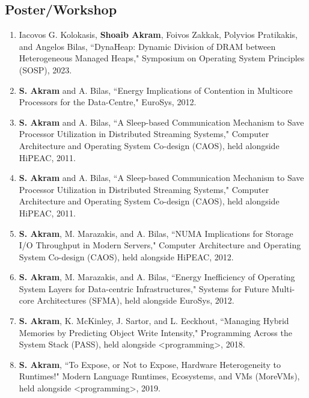 \documentclass[singlecolumn,singlespace,11pt]{article}
\begin{document}
\subsection*{Poster/Workshop}
\begin{enumerate}

\item
Iacovos G. Kolokasis, \textbf{Shoaib Akram}, Foivos Zakkak, Polyvios Pratikakis, and Angelos Bilas, ``DynaHeap: Dynamic Division of DRAM between Heterogeneous Managed Heaps,"
Symposium on Operating System Principles (SOSP), 2023. 

\item
\textbf{S. Akram} and A. Bilas, ``Energy Implications of Contention in Multicore Processors for the Data-Centre,"
EuroSys, 2012.

\item
\textbf{S. Akram} and A. Bilas, ``A Sleep-based Communication Mechanism to Save Processor Utilization in Distributed Streaming Systems,"
Computer Architecture and Operating System Co-design (CAOS), held alongside HiPEAC, 2011.


\item
\textbf{S. Akram} and A. Bilas, ``A Sleep-based Communication Mechanism to Save Processor Utilization in Distributed Streaming Systems,"
Computer Architecture and Operating System Co-design (CAOS), held alongside HiPEAC, 2011.

\item
\textbf{S. Akram}, M. Marazakis, and A. Bilas, ``NUMA Implications for Storage I/O Throughput in Modern Servers," 
Computer Architecture and Operating System Co-design (CAOS), held alongside HiPEAC, 2012. 

\item
\textbf{S. Akram}, M. Marazakis, and A. Bilas, ``Energy Inefficiency of Operating System Layers for Data-centric Infrastructures," Systems for Future Multi-core Architectures (SFMA), held alongside EuroSys, 2012.
\item
\textbf{S. Akram}, K. McKinley, J. Sartor, and L. Eeckhout, ``Managing Hybrid Memories by Predicting Object Write Intensity," Programming Across the System Stack (PASS), held alongside <programming>, 2018.

\item
\textbf{S. Akram}, ``To Expose, or Not to Expose, Hardware Heterogeneity to Runtimes!" Modern Language Runtimes, Ecosystems, and VMs (MoreVMs), held alongside <programming>, 2019.
\end{enumerate}
\end{document}
